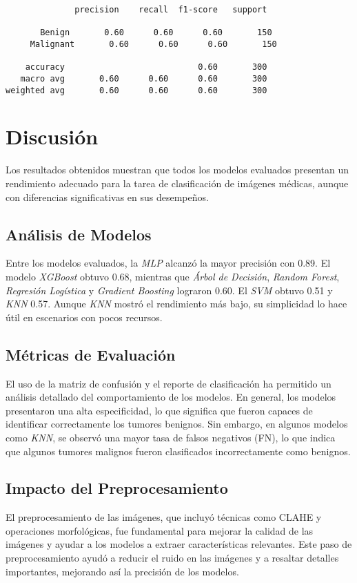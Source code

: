 \documentclass[12pt]{article}
\begin{document}
\begin{verbatim}
              precision    recall  f1-score   support

       Benign       0.60      0.60      0.60       150
     Malignant       0.60      0.60      0.60       150

    accuracy                           0.60       300
   macro avg       0.60      0.60      0.60       300
weighted avg       0.60      0.60      0.60       300
\end{verbatim}

\section{Discusión}
Los resultados obtenidos muestran que todos los modelos evaluados presentan un rendimiento adecuado para la tarea de clasificación de imágenes médicas, aunque con diferencias significativas en sus desempeños.

\subsection{Análisis de Modelos}
Entre los modelos evaluados, la \textit{MLP} alcanzó la mayor precisión con 0.89. El modelo \textit{XGBoost} obtuvo 0.68, mientras que \textit{Árbol de Decisión}, \textit{Random Forest}, \textit{Regresión Logística} y \textit{Gradient Boosting} lograron 0.60. El \textit{SVM} obtuvo 0.51 y \textit{KNN} 0.57. Aunque \textit{KNN} mostró el rendimiento más bajo, su simplicidad lo hace útil en escenarios con pocos recursos.

\subsection{Métricas de Evaluación}
El uso de la matriz de confusión y el reporte de clasificación ha permitido un análisis detallado del comportamiento de los modelos. En general, los modelos presentaron una alta especificidad, lo que significa que fueron capaces de identificar correctamente los tumores benignos. Sin embargo, en algunos modelos como \textit{KNN}, se observó una mayor tasa de falsos negativos (FN), lo que indica que algunos tumores malignos fueron clasificados incorrectamente como benignos.

\subsection{Impacto del Preprocesamiento}
El preprocesamiento de las imágenes, que incluyó técnicas como CLAHE y operaciones morfológicas\cite{soille1999morphological}, fue fundamental para mejorar la calidad de las imágenes y ayudar a los modelos a extraer características relevantes. Este paso de preprocesamiento ayudó a reducir el ruido en las imágenes y a resaltar detalles importantes, mejorando así la precisión de los modelos.
\end{document}
